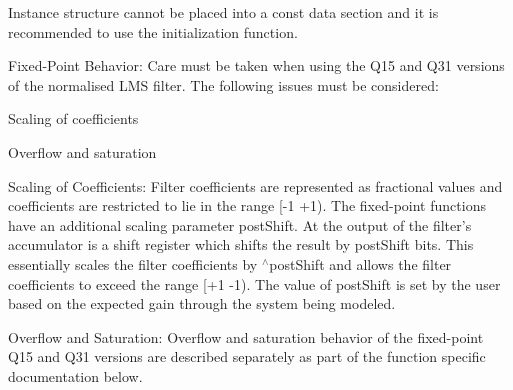 \begin{DoxyParagraph}{}
Instance structure cannot be placed into a const data section and it is recommended to use the initialization function. 
\end{DoxyParagraph}
\begin{DoxyParagraph}{Fixed-\/\-Point Behavior\-: }
Care must be taken when using the Q15 and Q31 versions of the normalised L\-M\-S filter. The following issues must be considered\-:
\begin{DoxyItemize}
\item Scaling of coefficients
\item Overflow and saturation
\end{DoxyItemize}
\end{DoxyParagraph}
\begin{DoxyParagraph}{Scaling of Coefficients\-: }
Filter coefficients are represented as fractional values and coefficients are restricted to lie in the range {\ttfamily \mbox{[}-\/1 +1)}. The fixed-\/point functions have an additional scaling parameter {\ttfamily post\-Shift}. At the output of the filter's accumulator is a shift register which shifts the result by {\ttfamily post\-Shift} bits. This essentially scales the filter coefficients by {$^\wedge$post\-Shift} and allows the filter coefficients to exceed the range {\ttfamily \mbox{[}+1 -\/1)}. The value of {\ttfamily post\-Shift} is set by the user based on the expected gain through the system being modeled.
\end{DoxyParagraph}
\begin{DoxyParagraph}{Overflow and Saturation\-: }
Overflow and saturation behavior of the fixed-\/point Q15 and Q31 versions are described separately as part of the function specific documentation below. 
\end{DoxyParagraph}


